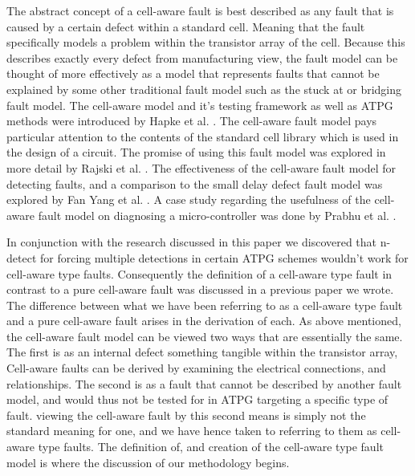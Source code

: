     The abstract concept of a cell-aware fault is best described as any fault that is caused by a certain defect within a standard cell. Meaning that the fault specifically models a problem within the transistor array of the cell. Because this describes exactly every defect from manufacturing view, the fault model can be thought of more effectively as a model that represents faults that cannot be explained by some other traditional fault model such as the stuck at or bridging fault model. The cell-aware model and it's testing framework as well as ATPG methods were introduced by Hapke et al. \cite{5355741} \cite{Hapke} \cite{6401533}. The cell-aware fault model pays particular attention to the contents of the standard cell library which is used in the design of a circuit. The promise of using this fault model was explored in more detail by Rajski et al. \cite{5227030}. The effectiveness of the cell-aware fault model for detecting faults, and a comparison to the small delay defect fault model was explored by Fan Yang et al. \cite{6979084}. A case study regarding the usefulness of the cell-aware fault model on diagnosing a micro-controller was done by Prabhu et al. \cite{6847826}.

    In conjunction with the research discussed in this paper we discovered that n-detect for forcing multiple detections in certain ATPG schemes wouldn't work for cell-aware type faults. Consequently the definition of a cell-aware type fault in contrast to a pure cell-aware fault was discussed in a previous paper we wrote. \cite{6875445} The difference between what we have been referring to as a cell-aware type fault and a pure cell-aware fault arises in the derivation of each. As above mentioned, the cell-aware fault model can be viewed two ways that are essentially the same. The first is as an internal defect something tangible within the transistor array, Cell-aware faults can be derived by examining the electrical connections, and relationships. The second is as a fault that cannot be described by another fault model, and would thus not be tested for in ATPG targeting a specific type of fault. viewing the cell-aware fault by this second means is simply not the standard meaning for one, and we have hence taken to referring to them as cell-aware type faults. The definition of, and creation of the cell-aware type fault model is where the discussion of our methodology begins.
